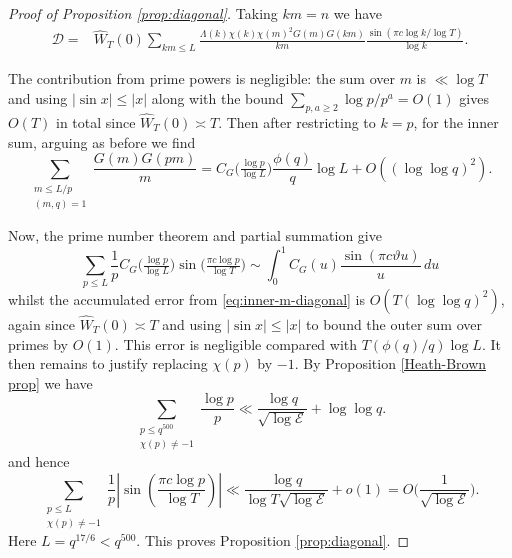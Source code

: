 \documentclass[12pt, oneside]{amsart}
\theoremstyle{definition}
\newcommand{\mc}{\mathcal}
\newcommand{\leqs}{\leqslant }
\newcommand{\geqs}{\geqslant }
\newcommand{\wh}{\widehat}
\newcommand{\1}{\mathds{1}}
\begin{document}
\begin{proof}[Proof of Proposition \ref{prop:diagonal}]
Taking $km=n$ we have 
\begin{align*}
 \mc{D}
 =
 &\wh W_T(0)
 \sum_{km\leqs L}
 \frac{\Lambda(k)\chi(k)\chi(m)^2 G(m)
 G(km)}{km}
 \frac{\sin(\pi c\log k/\log T)}{\log k}.
 \label{eq:prime-diagonal}
\end{align*}

The contribution from prime powers is negligible: the sum over $m$ is $\ll \log T$ and using $|\sin x|\leqs |x|$ along with the bound $\sum_{p, a\geqs 2}\log p/p^a=O(1)$ gives $O(T)$ in total since $\wh W_T(0)\asymp T$.  
Then after restricting to $k=p$, for the inner sum, arguing as before we find
\begin{equation}
 \sum_{\substack{m\leqs L/p\\(m,q)=1}}
 \frac{G(m)
 G(pm)}{m}
 =C_G\big(\tfrac{\log p}{\log L}\big)\frac{\phi(q)}q\log L
 +O((\log\log q)^2).
 \label{eq:inner-m-diagonal}
\end{equation}

Now, the prime number theorem and partial summation give
\begin{equation}
 \sum_{p\leqs L}\frac1p
 C_G\big(\tfrac{\log p}{\log L}\big)
 \sin\big(\tfrac{\pi c\log p}{\log T}\big)
\sim
 \int_0^1C_G(u)\frac{\sin(\pi c\vartheta u)}u\,du
 \label{eq:PNT-logscale}
\end{equation}
whilst the accumulated error from \eqref{eq:inner-m-diagonal} is $ O(T(\log\log q)^2)$, again since $\wh W_T(0)\asymp T$ and using $|\sin x|\leqs |x|$ to bound the outer sum over primes by $O(1)$. This error is negligible compared with $T(\phi(q)/q)\log L$.
It then remains to justify replacing $\chi(p)$ by $-1$.  By Proposition \ref{Heath-Brown prop}  we have 
\begin{equation*}
 \sum_{\substack{p\leqs q^{500}\\ \chi(p)\ne-1}}
 \frac{\log p}{p}
 \ll \frac{\log q}{\sqrt{\log\mc{E}}}+\log\log q.
\end{equation*}
and hence
\begin{equation*}
 \sum_{\substack{p\leqs L\\\chi(p)\ne-1}}
 \frac1p\left|\sin\!\left(\frac{\pi c\log p}{\log T}\right)\right|
 \ll\frac{\log q}{\log T\sqrt{\log\mc{E}}}+o(1)=O\Big(\frac{1}{\sqrt{\log \mc{E}}}\Big).
 \label{eq:bad-prime-error}
\end{equation*}
Here $L=q^{17/6}<q^{500}$.  This proves
Proposition \ref{prop:diagonal}.
\end{proof}
\end{document}
